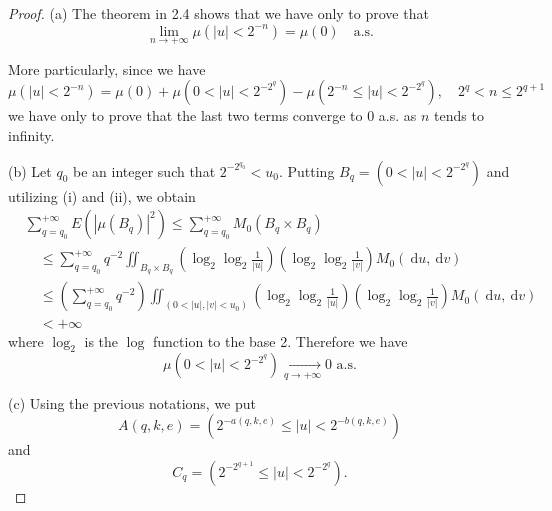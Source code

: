 \documentclass{article}
\theoremstyle{definition}
\begin{document}
\begin{proof}
(a) The theorem in 2.4 shows that we have only to prove that
\begin{equation}\label{eq:36}
\lim_{n \rightarrow+\infty} \mu\left(|u|<2^{-n}\right)=\mu(0) \quad \text{a.s.}
\end{equation}

More particularly, since we have
\begin{equation}\label{eq:37}
\mu\left(|u|<2^{-n}\right)=\mu(0)+\mu\left(0<|u|<2^{-2^{q}}\right)-\mu\left(2^{-n} \leqslant|u|<2^{-2^{q}}\right), \quad 2^{q}<n \leqslant 2^{q+1}
\end{equation}
we have only to prove that the last two terms converge to 0 a.s. as $n$ tends to infinity.

(b) Let $q_{0}$ be an integer such that $2^{-2^{q_{0}}}<u_{0}$. Putting $B_{q}=\left(0<|u|<2^{-2^{q}}\right)$ and utilizing (i) and (ii), we obtain
\begin{equation}\label{eq:38}
\begin{aligned}
&\sum_{q=q_{0}}^{+\infty} E\left(\left|\mu\left(B_{q}\right)\right|^{2}\right) \leqslant \sum_{q=q_{0}}^{+\infty} M_{0}\left(B_{q} \times B_{q}\right) \\
&\quad \leqslant \sum_{q=q_{0}}^{+\infty} q^{-2} \iint_{B_{q} \times B_{q}}\left(\log_{2} \log_{2} \frac{1}{|u|}\right)\left(\log_{2} \log_{2} \frac{1}{|v|}\right) M_{0}(\mathrm{~d} u, \mathrm{~d} v) \\
&\quad \leqslant\left(\sum_{q=q_{0}}^{+\infty} q^{-2}\right) \iint_{\left(0<|u|,|v|<u_{0}\right)}\left(\log_{2} \log_{2} \frac{1}{|u|}\right)\left(\log_{2} \log_{2} \frac{1}{|v|}\right) M_{0}(\mathrm{~d} u, \mathrm{~d} v) \\
&\quad<+\infty
\end{aligned}
\end{equation}
where $\log_{2}$ is the $\log$ function to the base 2. Therefore we have
\begin{equation}\label{eq:39}
\mu\left(0<|u|<2^{-2^{q}}\right) \underset{q \rightarrow+\infty}{\longrightarrow} 0 \text{ a.s.}
\end{equation}

(c) Using the previous notations, we put
\begin{equation}\label{eq:40}
A(q, k, e)=\left(2^{-a(q, k, e)} \leqslant|u|<2^{-b(q, k, e)}\right)
\end{equation}
and
\begin{equation}\label{eq:41}
C_{q}=\left(2^{-2^{q+1}} \leqslant|u|<2^{-2^{q}}\right).
\end{equation}


\end{proof}
\end{document}
